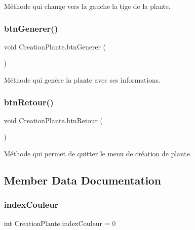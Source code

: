 Méthode qui change vers la gauche la tige de la plante. \mbox{\label{class_creation_plante_a221cfab4a34d6f5f31f71c440c57a646}} 
\subsubsection{\texorpdfstring{btn\+Generer()}{btnGenerer()}}
{\footnotesize\ttfamily void Creation\+Plante.\+btn\+Generer (\begin{DoxyParamCaption}{ }\end{DoxyParamCaption})\hspace{0.3cm}{\ttfamily [inline]}}

Méthode qui genère la plante avec ses informations. \mbox{\label{class_creation_plante_a382dc77d8f13e4da0b2b36eae58f3324}} 
\subsubsection{\texorpdfstring{btn\+Retour()}{btnRetour()}}
{\footnotesize\ttfamily void Creation\+Plante.\+btn\+Retour (\begin{DoxyParamCaption}{ }\end{DoxyParamCaption})\hspace{0.3cm}{\ttfamily [inline]}}

Méthode qui permet de quitter le menu de création de plante. 

\subsection{Member Data Documentation}
\mbox{\label{class_creation_plante_ae227d3a64d78322a275183f2343837e5}} 
\subsubsection{\texorpdfstring{index\+Couleur}{indexCouleur}}
{\footnotesize\ttfamily int Creation\+Plante.\+index\+Couleur = 0\hspace{0.3cm}{\ttfamily [private]}}

